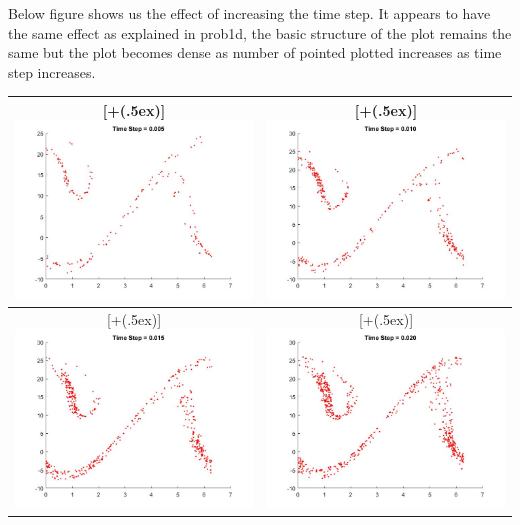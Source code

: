 \documentclass{article}
\newcommand*{\addheight}[2][.5ex]{%
  \raisebox{0pt}[\dimexpr\height+(#1)\relax]{#2}%
}
\begin{document}
\begin{enumerate}[label=(\alph*)]
\par\medskip
Below figure shows us the effect of increasing the time step. It appears to have the same effect as explained in prob1d, the basic structure of the plot remains the same but the plot becomes dense as number of pointed plotted increases as time step increases.
\par\medskip
\begin{minipage}{\linewidth}
{
\begin{table}[H]
\centering
\begin{tabular}{|c|c|}
	\hline
	\addheight{\includegraphics[width=75mm]{images/prob2d1.jpg}} &
    \addheight{\includegraphics[width=75mm]{images/prob2d2.jpg}} \\
    \hline
    \addheight{\includegraphics[width=75mm]{images/prob2d3.jpg}} &
    \addheight{\includegraphics[width=75mm]{images/prob2d4.jpg}} \\

\end{tabular}
\end{table}}
\end{minipage}
\end{enumerate}
\end{document}

